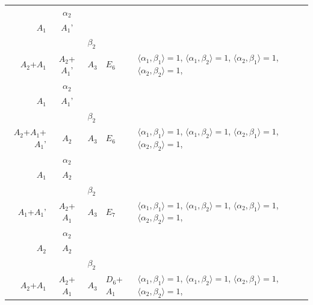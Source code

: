 \documentclass[12pt]{report}
\begin{document}
\begin{appendix}
{\begin{longtable}{rcl p{1cm}p{1cm}p{3cm} }
\\
\begin{tabular}{cc}$\alpha_1$+ & $\alpha_2$\\\tiny{ $A_1$ } & \tiny{ $A_1$' }\end{tabular} &\begin{tabular}{c} = \\~ \end{tabular} & \begin{tabular}{cc}$\beta_1$+ & $\beta_2$\\\tiny{ $A_2$+$A_1$ } & \tiny{ $A_2$+$A_1$' }\end{tabular} & $A_3$ & $E_6$ &  $\langle\alpha_1, \beta_1\rangle=1$, $\langle\alpha_1, \beta_2\rangle=1$, $\langle\alpha_2, \beta_1\rangle=1$, $\langle\alpha_2, \beta_2\rangle=1$, 
\\
\begin{tabular}{cc}$\alpha_1$+ & $\alpha_2$\\\tiny{ $A_1$ } & \tiny{ $A_1$' }\end{tabular} &\begin{tabular}{c} = \\~ \end{tabular} & \begin{tabular}{cc}$\beta_1$+ & $\beta_2$\\\tiny{ $A_2$+$A_1$+$A_1$' } & \tiny{ $A_2$ }\end{tabular} & $A_3$ & $E_6$ &  $\langle\alpha_1, \beta_1\rangle=1$, $\langle\alpha_1, \beta_2\rangle=1$, $\langle\alpha_2, \beta_1\rangle=1$, $\langle\alpha_2, \beta_2\rangle=1$, 
\\
\begin{tabular}{cc}$\alpha_1$+ & $\alpha_2$\\\tiny{ $A_1$ } & \tiny{ $A_2$ }\end{tabular} &\begin{tabular}{c} = \\~ \end{tabular} & \begin{tabular}{cc}$\beta_1$+ & $\beta_2$\\\tiny{ $A_1$+$A_1$' } & \tiny{ $A_2$+$A_1$ }\end{tabular} & $A_3$ & $E_7$ &  $\langle\alpha_1, \beta_1\rangle=1$, $\langle\alpha_1, \beta_2\rangle=1$, $\langle\alpha_2, \beta_1\rangle=1$, $\langle\alpha_2, \beta_2\rangle=1$, 
\\
\begin{tabular}{cc}$\alpha_1$+ & $\alpha_2$\\\tiny{ $A_2$ } & \tiny{ $A_2$ }\end{tabular} &\begin{tabular}{c} = \\~ \end{tabular} & \begin{tabular}{cc}$\beta_1$+ & $\beta_2$\\\tiny{ $A_2$+$A_1$ } & \tiny{ $A_2$+$A_1$ }\end{tabular} & $A_3$ & $D_6$+$A_1$ &  $\langle\alpha_1, \beta_1\rangle=1$, $\langle\alpha_1, \beta_2\rangle=1$, $\langle\alpha_2, \beta_1\rangle=1$, $\langle\alpha_2, \beta_2\rangle=1$, 

\end{longtable}}
\end{appendix}
\end{document}
